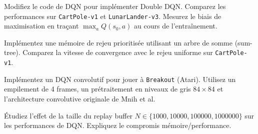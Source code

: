\begin{exercice}
Modifiez le code de DQN pour impl\'ementer Double DQN. Comparez les performances
sur \texttt{CartPole-v1} et \texttt{LunarLander-v3}. Mesurez le biais de
maximisation en tra\c{c}ant $\max_a Q(s_0, a)$ au cours de l'entra\^inement.
\end{exercice}

\begin{exercice}
Impl\'ementez une m\'emoire de rejeu prioritis\'ee utilisant un arbre de somme
(sum-tree). Comparez la vitesse de convergence avec le rejeu uniforme sur
\texttt{CartPole-v1}.
\end{exercice}

\begin{exercice}
Impl\'ementez un DQN convolutif pour jouer \`a \texttt{Breakout} (Atari).
Utilisez un empilement de 4 frames, un pr\'etraitement en niveaux de gris
$84 \times 84$ et l'architecture convolutive originale de Mnih et al.
\end{exercice}

\begin{exercice}
\'Etudiez l'effet de la taille du replay buffer $N \in \{1000, 10000, 100000, 1000000\}$
sur les performances de DQN. Expliquez le compromis m\'emoire/performance.
\end{exercice}
